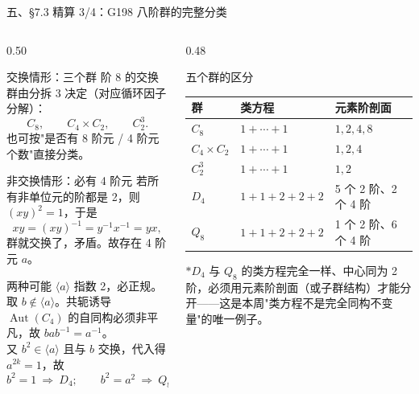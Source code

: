 \documentclass[aspectratio=169,10pt,fontset=none]{ctexbeamer}
\newcommand{\starpt}{\textcolor{accent}{\bfseries$\ast$}}
\begin{document}
\begin{frame}[t]{五、\S7.3 精算 3/4：G198 八阶群的完整分类}
  \begin{columns}[T,onlytextwidth]
    \begin{column}{0.50\textwidth}
      \begin{block}{\footnotesize 交换情形：三个群}
        \scriptsize
        阶 8 的交换群由分拆 $3$ 决定（对应循环因子分解）：
        \[ C_8,\qquad C_4\times C_2,\qquad C_2^3. \]
        也可按"是否有 8 阶元 / 4 阶元个数"直接分类。
      \end{block}
      \begin{block}{\footnotesize 非交换情形：必有 4 阶元}
        \scriptsize
        若所有非单位元的阶都是 2，则 $(xy)^2=1$，于是
        \[ xy=(xy)^{-1}=y^{-1}x^{-1}=yx, \]
        群就交换了，矛盾。故存在 4 阶元 $a$。
      \end{block}
      \begin{exampleblock}{\footnotesize 两种可能}
        \scriptsize
        $\langle a\rangle$ 指数 2，必正规。取 $b\notin\langle a\rangle$。共轭诱导 $\operatorname{Aut}(C_4)$ 的自同构必须非平凡，故 $bab^{-1}=a^{-1}$。\\
        又 $b^2\in\langle a\rangle$ 且与 $b$ 交换，代入得 $a^{2k}=1$，故
        \[ b^2=1\ \Rightarrow\ D_4;\qquad b^2=a^2\ \Rightarrow\ Q_8. \]
      \end{exampleblock}
    \end{column}
    \begin{column}{0.48\textwidth}
      \centering
      \begin{block}{\footnotesize 五个群的区分}
        \scriptsize
        \renewcommand{\arraystretch}{1.18}
        \begin{tabular}{@{}l l l@{}}
          \toprule
          群 & 类方程 & 元素阶剖面\\
          \midrule
          $C_8$ & $1+\cdots+1$ & $1,2,4,8$\\
          $C_4\times C_2$ & $1+\cdots+1$ & $1,2,4$\\
          $C_2^3$ & $1+\cdots+1$ & $1,2$\\
          $D_4$ & $1+1+2+2+2$ & 5 个 2 阶、2 个 4 阶\\
          $Q_8$ & $1+1+2+2+2$ & 1 个 2 阶、6 个 4 阶\\
          \bottomrule
        \end{tabular}
      \end{block}
      \footnotesize\color{ink!80}
      \starpt $D_4$ 与 $Q_8$ 的类方程完全一样、中心同为 2 阶，必须用元素阶剖面（或子群结构）才能分开——这是本周"类方程不是完全同构不变量"的唯一例子。
    \end{column}
  \end{columns}
\end{frame}
\end{document}
